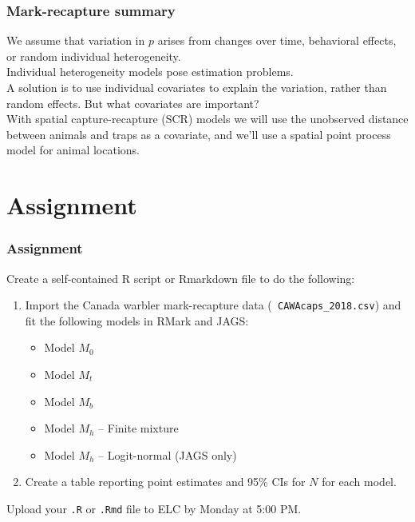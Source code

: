 \documentclass[color=usenames,dvipsnames]{beamer}\usepackage[]{graphicx}\usepackage[]{color}
\begin{document}


\begin{frame}
  \frametitle{Mark-recapture summary}
  We assume that variation in $p$ arises from changes over time,
  behavioral effects, or random individual heterogeneity. \\
  \pause \vfill
  Individual heterogeneity models pose estimation problems. \\
  \pause \vfill
  A solution is to use individual covariates to explain the variation,
  rather than random effects. \pause But what covariates are
  important? \\
  \pause \vfill
  With spatial capture-recapture (SCR) models we will use
  \alert{the unobserved distance between animals and traps} as a
  covariate, and we'll use a spatial point process model for
  animal locations.  
\end{frame}




\section{Assignment}




\begin{frame}[fragile]
  \frametitle{Assignment}
  Create a self-contained R script or Rmarkdown file to do the
  following: 
  \vfill
  \begin{enumerate}
    \item Import the Canada warbler mark-recapture data ({\tt
        CAWAcaps\_2018.csv}) and fit the following models in RMark and
      JAGS:
      \begin{itemize}
        \item Model $M_0$
        \item Model $M_t$ 
        \item Model $M_b$
        \item Model $M_h$ -- Finite mixture
        \item Model $M_h$ -- Logit-normal (JAGS only)
      \end{itemize}
    \item Create a table reporting point estimates and 95\% CIs for
      $N$ for each model. 
  \end{enumerate}
  \vfill
  Upload your {\tt .R} or {\tt .Rmd} file to ELC by Monday at 5:00 PM. 
\end{frame}
\end{document}
